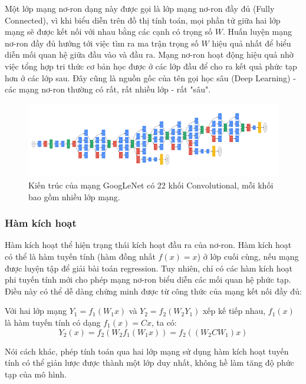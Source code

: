 \documentclass[12pt]{extreport}
\begin{document}
Một lớp mạng nơ-ron dạng này được gọi là lớp mạng nơ-ron đầy đủ (Fully Connected), vì khi biểu diễn trên đồ thị tính toán, mọi phần tử giữa hai lớp mạng sẽ được kết nối với nhau bằng các cạnh có trọng số $ W $. Huấn luyện mạng nơ-ron đầy đủ hướng tới việc tìm ra ma trận trọng số $ W $ hiệu quả nhất để biểu diễn mối quan hệ giữa đầu vào và đầu ra. Mạng nơ-ron hoạt động hiệu quả nhờ việc tổng hợp tri thức cơ bản học được ở các lớp đầu để cho ra kết quả phức tạp hơn ở các lớp sau. Đây cũng là nguồn gốc của tên gọi học sâu (Deep Learning) - các mạng nơ-ron thường có rất, rất nhiều lớp - rất "sâu".

\begin{figure}[H]
    \centering
    \includegraphics[width=\textwidth]{figure5}
    \caption{Kiến trúc của mạng GoogLeNet có 22 khối Convolutional, mỗi khối bao gồm nhiều lớp mạng.}
\end{figure}

\subsubsection{Hàm kích hoạt}

Hàm kích hoạt thể hiện trạng thái kích hoạt đầu ra của nơ-ron. Hàm kích hoạt có thể là hàm tuyến tính (hàm đồng nhất $ f(x) = x $) ở lớp cuối cùng, nếu mạng được luyện tập để giải bài toán regression. Tuy nhiên, chỉ có các hàm kích hoạt phi tuyến tính mới cho phép mạng nơ-ron biểu diễn các mối quan hệ phức tạp. Điều này có thể dễ dàng chứng minh được từ công thức của mạng kết nối đầy đủ:

Với hai lớp mạng $ Y_1 = f_1(W_1x) $ và $ Y_2 = f_2(W_2Y_1) $ xếp kế tiếp nhau, $ f_1(x) $ là hàm tuyến tính có dạng $ f_1(x) = Cx $, ta có:
$$ Y_2(x) = f_2(W_2f_1(W_1x)) = f_2((W_2CW_1)x) $$

Nói cách khác, phép tính toán qua hai lớp mạng sử dụng hàm kích hoạt tuyến tính có thể giản lược được thành một lớp duy nhất, không hề làm tăng độ phức tạp của mô hình.
\end{document}
